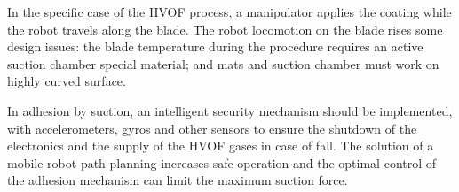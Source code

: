 In the specific case of the HVOF process, a manipulator applies the coating 
while the robot travels along the blade. The robot locomotion on the blade rises
some design issues: the blade temperature during the procedure requires an
active suction chamber special material; and mats and suction chamber must
work on highly curved surface.



In adhesion by suction, an intelligent security mechanism should be implemented,
with accelerometers, gyros and other sensors to ensure the shutdown of the
electronics and the supply of the HVOF gases in case of fall. The solution of a
mobile robot path planning increases safe operation and the optimal control of the adhesion
mechanism can limit the maximum suction force.






